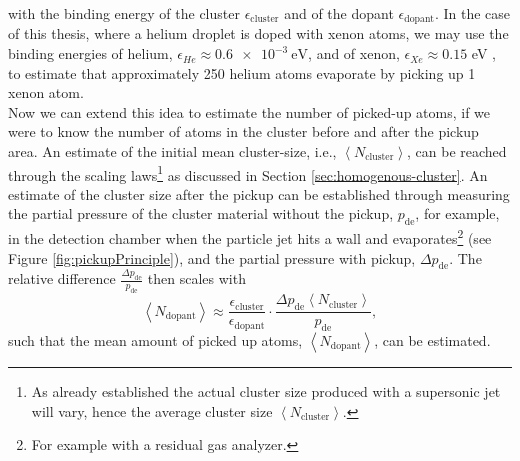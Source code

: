 with the binding energy of the cluster $\epsilon_{\text{cluster}}$ and of the dopant $\epsilon_{\text{dopant}}$. In the case of this thesis, where a helium droplet is doped with xenon atoms, we may use the binding energies of helium, $\epsilon_{He}\approx \SI{0.6e-3}{\electronvolt}$, and of xenon, $\epsilon_{Xe}\approx 0.15$ eV \citep{Gomez-2011-JCP,Gomez-2014-Science}, to estimate that approximately 250 helium atoms evaporate by picking up 1 xenon atom.\\[1\baselineskip]
%
Now we can extend this idea to estimate the number of picked-up atoms, if we were to know the number of atoms in the cluster before and after the pickup area. An estimate of the initial mean cluster-size, i.e., $\left\langle N_{\text{cluster}}\right\rangle$, can be reached through the scaling laws\footnote{As already established the actual cluster size produced with a supersonic jet will vary, hence the average cluster size $\left\langle N_{\text{cluster}}\right\rangle$.} as discussed in Section \ref{sec:homogenous-cluster}. An estimate of the cluster size after the pickup can be established through measuring the partial pressure of the cluster material without the pickup, $p_{\text{de}}$, for example, in the detection chamber when the particle jet hits a wall and evaporates\footnote{For example with a residual gas analyzer.} (see Figure \ref{fig:pickupPrinciple}), and the partial pressure with pickup, $\Delta p_{\text{de}}$. The relative difference $\tfrac{\Delta p_{\text{de}}}{p_{\text{de}}}$ then scales with
\begin{equation}
\left\langle N_{\text{dopant}}\right\rangle \approx \frac{\epsilon_{\text{cluster}}}{\epsilon_{\text{dopant}}} \cdot \frac{\Delta p_{\text{de}} \left\langle N_{\text{cluster}}\right\rangle}{p_{\text{de}}},
\label{eq:average-dopant}
\end{equation}
such that the mean amount of picked up atoms, $\left\langle N_{\text{dopant}}\right\rangle$, can be estimated.
%
